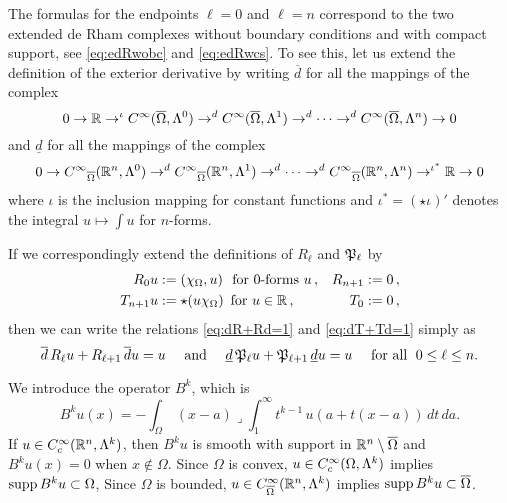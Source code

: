 \documentclass[a4paper]{article}
\begin{document}
The formulas for the endpoints $\ell=0$ and $\ell=n$ correspond to the two extended de Rham complexes without boundary conditions and with compact support, see \eqref{eq:edRwobc} and \eqref{eq:edRwcs}. To see this, let us extend the definition of the exterior derivative by writing $\overline d$ for all the mappings of the complex
$$
 0 \to{\mathbb R}\to^\iota{C^\infty}(\overline\Omega,\Lambda^0) \to^d {C^\infty}(\overline\Omega,\Lambda^1)
 \to^d\cdots \to^d {C^\infty}(\overline\Omega,\Lambda^n) \to 0
$$ 
and $\underline d$ for all the mappings of the complex
$$
 0 \to {C^\infty}_{\overline\Omega}({\mathbb R}^n,\Lambda^0) \to^d {C^\infty}_{\overline\Omega}({\mathbb R}^n,\Lambda^1) \to^d\cdots
 \to^d {C^\infty}_{\overline\Omega}({\mathbb R}^n,\Lambda^n) \to^{\iota^*} {\mathbb R} \to 0
$$
where $\iota$ is the inclusion mapping for constant functions and 
$\iota^*=(\star\iota)'$ denotes the integral $u\mapsto\int\!u$ for $n$-forms.

If we correspondingly extend the definitions of $R_{\ell}$ and ${\mathfrak P}_{\ell}$ by
$$
\begin{aligned}
  R_0u &:=\left(\chi_{\Omega},u\right)\,\text{ for $0$-forms }u\,, &
  R_{n+1} &:=0\,,\\
  T_{n+1}u &:= \star(u\chi_{\Omega}) \,\text{ for }u\in{\mathbb R}\,,  &
  T_0 &:= 0\,,
\end{aligned}
$$
then we can write the relations \eqref{eq:dR+Rd=1} and \eqref{eq:dT+Td=1} simply as
\begin{equation}\label{eq:R&T&d}
 \overline d\,R_{\ell} u + R_{\ell+1} \,\overline d u  = u
 \quad \text{ and }\quad
 \underline d\,{\mathfrak P}_{\ell} u + {\mathfrak P}_{\ell+1} \,\underline du = u\quad \text{ for all }\;
  0\le\ell\le n.
\end{equation}

 
 
 


We introduce the operator $B^{k}$, which is
\begin{equation}\label{eq:Bogo} %
    B^{k} u(x) = - \int_{\Omega} \,(x-a) \lrcorner \int_1^\infty t^{{k}-1}\,u\left( a+t(x-a) \right) \,dt\,da.
\end{equation}
If $u \in C^{\infty}_{c}({\mathbb R}^{n},\Lambda^{k})$, 
then $B^{k} u$ is smooth with support in ${\mathbb R}^{n}\setminus\overline\Omega$ and $B^{k} u(x) = 0$ when $x \notin \Omega$. 
Since $\Omega$ is convex, $u \in C^{\infty}_{c}(\Omega,\Lambda^{k})$ implies $\operatorname{supp} B^{k} u \subset\Omega$, 
Since $\Omega$ is bounded, $u \in C^{\infty}_{\overline\Omega}({\mathbb R}^{n},\Lambda^{k})$ implies $\operatorname{supp} B^{k} u \subset\overline\Omega$. 
\end{document}
